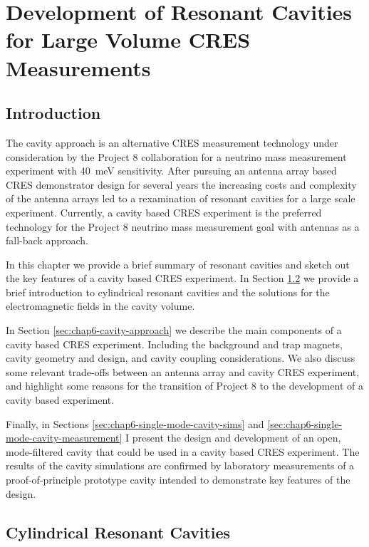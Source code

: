 
\chapter{Development of Resonant Cavities for Large Volume CRES Measurements}

\section{Introduction}

The cavity approach is an alternative CRES measurement technology under consideration by the Project 8 collaboration for a neutrino mass measurement experiment with 40~meV sensitivity. After pursuing an antenna array based CRES demonstrator design for several years the increasing costs and complexity of the antenna arrays led to a rexamination of resonant cavities for a large scale experiment. Currently, a cavity based CRES experiment is the preferred technology for the Project 8 neutrino mass measurement goal with antennas as a fall-back approach. 

In this chapter we provide a brief summary of resonant cavities and sketch out the key features of a cavity based CRES experiment. In Section \ref{sec:chap6-resonant-cavities} we provide a brief introduction to cylindrical resonant cavities and the solutions for the electromagnetic fields in the cavity volume.

In Section \ref{sec:chap6-cavity-approach} we describe the main components of a cavity based CRES experiment. Including the background and trap magnets, cavity geometry and design, and cavity coupling considerations. We also discuss some relevant trade-offs between an antenna array and cavity CRES experiment, and highlight some reasons for the transition of Project 8 to the development of a cavity based experiment.

Finally, in Sections \ref{sec:chap6-single-mode-cavity-sims} and \ref{sec:chap6-single-mode-cavity-measurement} I present the design and development of an open, mode-filtered cavity that could be used in a cavity based CRES experiment. The results of the cavity simulations are confirmed by laboratory measurements of a proof-of-principle prototype cavity intended to demonstrate key features of the design.

\section{Cylindrical Resonant Cavities}
\label{sec:chap6-resonant-cavities}

